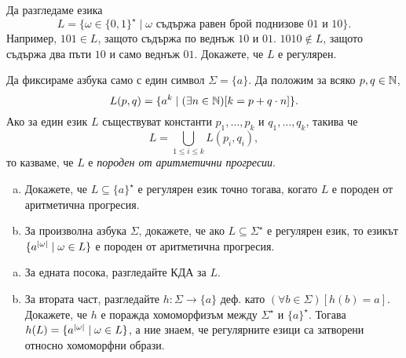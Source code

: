\begin{problem}
  Да разгледаме езика
  \[L = \{\omega \in \{0,1\}^\star \mid \omega\text{ съдържа равен брой поднизове }01\text{ и }10\}.\]
  Например, $101 \in L$, защото съдържа по веднъж $10$ и $01$.
  $1010 \not\in  L$, защото съдържа два пъти $10$ и само веднъж $01$.
  Докажете, че $L$ е регулярен.
\end{problem}


\begin{problem}
  Да фиксираме азбука само с един символ $\Sigma = \{a\}$.
  Да положим за всяко $p,q\in\mathbb{N}$, 
  \[L(p,q) = \{a^k \mid (\exists n\in\mathbb{N})[k = p+q\cdot n]\}.\]
  Ако за един език $L$ съществуват константи $p_1,\dots,p_k$ и $q_1,\dots,q_k$, такива че 
  \[L = \bigcup_{1\leq i \leq k} L(p_i,q_i),\]
  то казваме, че $L$ е {\em породен от аритметични прогресии}.
  \begin{enumerate}[a)]
  \item 
    Докажете, че $L \subseteq \{a\}^\star$ е регулярен език точно тогава, когато $L$ е породен от аритметична прогресия.
  \item
    За произволна азбука $\Sigma$, докажете, че ако $L \subseteq \Sigma^\star$ е регулярен език,
    то езикът $\{a^{\lvert{\omega}\rvert} \mid \omega \in L\}$  е породен от аритметична прогресия.    
  \end{enumerate}
\end{problem}
\begin{hint}
  \begin{enumerate}[a)]
  \item 
    За едната посока, разгледайте КДА за $L$.
  \item
    За втората част, разгледайте $h:\Sigma\to\{a\}$ деф. като $(\forall b\in\Sigma)[h(b) = a]$.
    Докажете, че $h$ е поражда хомоморфизъм между $\Sigma^\star$ и $\{a\}^\star$.
    Тогава $h(L) = \{a^{\lvert{\omega}\rvert} \mid \omega \in L\}$, а
    ние знаем, че регулярните езици са затворени относно хомоморфни образи.  
  \end{enumerate}
\end{hint}

